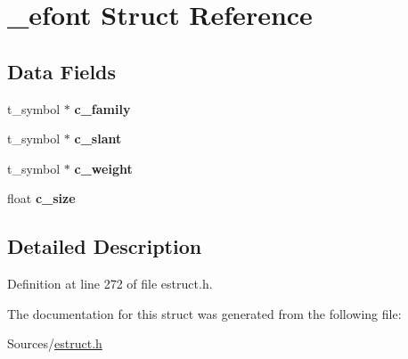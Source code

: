 \hypertarget{struct__efont}{\section{\-\_\-efont Struct Reference}
\label{struct__efont}
}
\subsection*{Data Fields}
\begin{DoxyCompactItemize}
\item 
\hypertarget{struct__efont_ad0a12c28988a03d63f0a63ae52545b7e}{t\-\_\-symbol $\ast$ {\bfseries c\-\_\-family}}\label{struct__efont_ad0a12c28988a03d63f0a63ae52545b7e}

\item 
\hypertarget{struct__efont_afe59dcb9bf09d16691d63350aba4e22f}{t\-\_\-symbol $\ast$ {\bfseries c\-\_\-slant}}\label{struct__efont_afe59dcb9bf09d16691d63350aba4e22f}

\item 
\hypertarget{struct__efont_a1e65976e3fc680a945be671bbcada87c}{t\-\_\-symbol $\ast$ {\bfseries c\-\_\-weight}}\label{struct__efont_a1e65976e3fc680a945be671bbcada87c}

\item 
\hypertarget{struct__efont_a0c2e0d8b2b562976f466b37e1804e896}{float {\bfseries c\-\_\-size}}\label{struct__efont_a0c2e0d8b2b562976f466b37e1804e896}

\end{DoxyCompactItemize}


\subsection{Detailed Description}


Definition at line 272 of file estruct.\-h.



The documentation for this struct was generated from the following file\-:\begin{DoxyCompactItemize}
\item 
Sources/\hyperlink{estruct_8h}{estruct.\-h}\end{DoxyCompactItemize}

